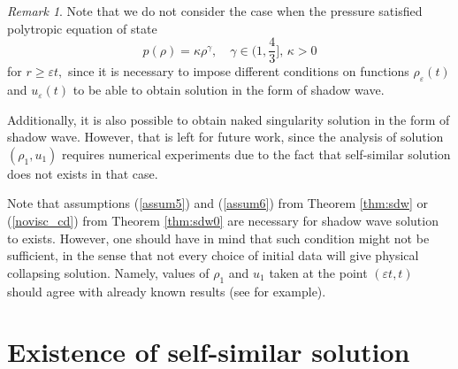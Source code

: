 \documentclass[reqno]{article}%
\theoremstyle{plain}
\theoremstyle{definition}
\theoremstyle{remark}
\newtheorem{remark}{Remark}[section]
\numberwithin{equation}{section}
\begin{document}
\begin{remark}
Note that we do not consider the case when the pressure satisfied polytropic equation of state
\[p(\rho)=\kappa \rho^\gamma,\quad \gamma\in\Big(1,\frac{4}{3}\Big],\,\kappa>0\]
for $r\geq \varepsilon t,$ since it is necessary to impose different conditions on functions $\rho_\varepsilon(t)$ and $u_\varepsilon(t)$ to be able to obtain solution in the form of shadow wave.

 Additionally, it is also possible to obtain naked singularity solution in the form of shadow wave. However, that is left for future work, since the analysis of solution $(\rho_1,u_1)$ requires numerical experiments due to the fact that self-similar solution does not exists in that case. 

 

 


\end{remark}

\medskip


Note that assumptions (\ref{assum5}) and (\ref{assum6}) from Theorem \ref{thm:sdw} or (\ref{novisc_cd}) from Theorem \ref{thm:sdw0} are necessary for shadow wave solution to exists. However, one should have in mind that such condition might not be sufficient, in the sense that not every choice of initial data will give physical collapsing solution. Namely, values of $\rho_1$ and $u_1$ taken at the point $(\varepsilon t,t)$ should agree with already known results (see \cite{shu} for example). 


\section{Existence of self-similar solution}\label{sec:ss}
\end{document}
